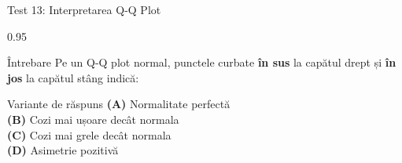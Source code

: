 \documentclass[9pt, aspectratio=169, t]{beamer}
\begin{document}
\begin{frame}{Test 13: Interpretarea Q-Q Plot}
\begin{cminipage}{0.95\textwidth}
    \begin{alertblock}{Întrebare}
        Pe un Q-Q plot normal, punctele curbate \textbf{în sus} la capătul drept și \textbf{în jos} la capătul stâng indică:
    \end{alertblock}

    \vspace{0.5cm}
    \begin{block}{Variante de răspuns}
    \textcolor{MainBlue}{\textbf{(A)}} Normalitate perfectă\\[3pt]
    \textcolor{MainBlue}{\textbf{(B)}} Cozi mai ușoare decât normala\\[3pt]
    \textcolor{MainBlue}{\textbf{(C)}} Cozi mai grele decât normala\\[3pt]
    \textcolor{MainBlue}{\textbf{(D)}} Asimetrie pozitivă
    \end{block}
\end{cminipage}
\end{frame}
\end{document}
